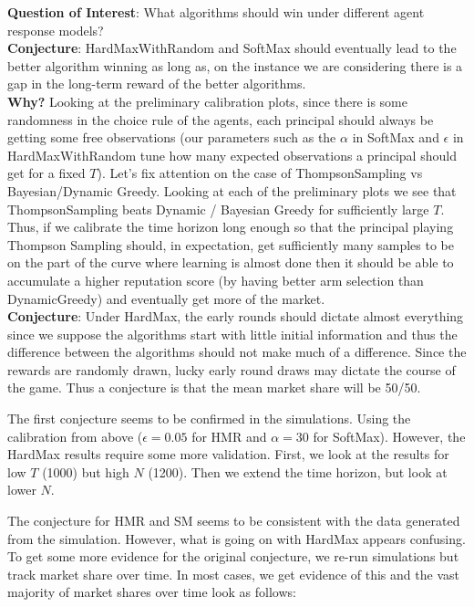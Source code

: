 \documentclass[11pt,letterpaper]{article}
\begin{document}
\textbf{Question of Interest}: What algorithms should win under different agent response models? \\
\textbf{Conjecture}: HardMaxWithRandom and SoftMax should eventually lead to the better algorithm winning as long as, on the instance we are considering there is a gap in the long-term reward of the better algorithms. \\
\textbf{Why?} Looking at the preliminary calibration plots, since there is some randomness in the choice rule of the agents, each principal should always be getting some free observations (our parameters such as the $\alpha$ in SoftMax and $\epsilon$ in HardMaxWithRandom tune how many expected observations a principal should get for a fixed $T$).  Let's fix attention on the case of ThompsonSampling vs Bayesian/Dynamic Greedy. Looking at each of the preliminary plots we see that ThompsonSampling beats Dynamic / Bayesian Greedy for sufficiently large $T$. Thus, if we calibrate the time horizon long enough so that the principal playing Thompson Sampling should, in expectation, get sufficiently many samples to be on the part of the curve where learning is almost done then it should be able to accumulate a higher reputation score (by having better arm selection than DynamicGreedy) and eventually get more of the market. \\

\textbf{Conjecture}: Under HardMax, the early rounds should dictate almost everything since we suppose the algorithms start with little initial information and thus the difference between the algorithms should not make much of a difference. Since the rewards are randomly drawn, lucky early round draws may dictate the course of the game. Thus a conjecture is that the mean market share will be 50/50.

The first conjecture seems to be confirmed in the simulations. Using the calibration from above ($\epsilon = 0.05$ for HMR and $\alpha = 30$ for SoftMax). However, the HardMax results require some more validation. First, we look at the results for low $T$ (1000) but high $N$ (1200). Then we extend the time horizon, but look at lower $N$.





The conjecture for HMR and SM seems to be consistent with the data generated from the simulation. However, what is going on with HardMax appears confusing. To get some more evidence for the original conjecture, we re-run simulations but track market share over time. In most cases, we get evidence of this and the vast majority of market shares over time look as follows:
\end{document}
